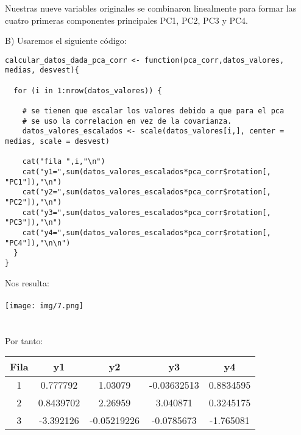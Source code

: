 \begin{sol}
Nuestras nueve variables originales se combinaron linealmente para formar las cuatro primeras componentes principales PC1, PC2, PC3 y PC4.

\pagebreak

B) Usaremos el siguiente código: 
\begin{verbatim}
calcular_datos_dada_pca_corr <- function(pca_corr,datos_valores, medias, desvest){

  for (i in 1:nrow(datos_valores)) {

    # se tienen que escalar los valores debido a que para el pca
    # se uso la correlacion en vez de la covarianza.
    datos_valores_escalados <- scale(datos_valores[i,], center = medias, scale = desvest)

    cat("fila ",i,"\n")
    cat("y1=",sum(datos_valores_escalados*pca_corr$rotation[, "PC1"]),"\n")
    cat("y2=",sum(datos_valores_escalados*pca_corr$rotation[, "PC2"]),"\n")
    cat("y3=",sum(datos_valores_escalados*pca_corr$rotation[, "PC3"]),"\n")
    cat("y4=",sum(datos_valores_escalados*pca_corr$rotation[, "PC4"]),"\n\n")
  }
}
\end{verbatim}
Nos resulta:\\\\
\texttt{[image: img/7.png]}\\\\ \\

Por tanto:
\begin{table}[h]
    \centering
    \begin{tabular}{|c|c|c|c|c|}
        \hline
        \textbf{Fila} & \textbf{y1} & \textbf{y2} & \textbf{y3} & \textbf{y4} \\
        \hline
        1 & 0.777792 & 1.03079 & -0.03632513 & 0.8834595 \\
        2 & 0.8439702 & 2.26959 & 3.040871 & 0.3245175 \\
        3 & -3.392126 & -0.05219226 & -0.0785673 & -1.765081 \\
        \hline
    \end{tabular}
    \label{tab:valores_pca}
\end{table}
\end{sol}

